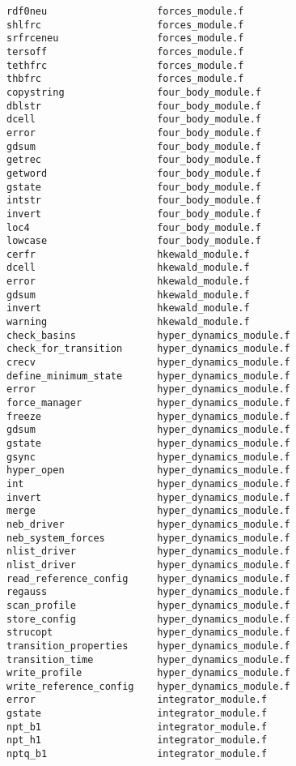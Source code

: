 \begin{verbatim}
rdf0neu                   forces_module.f
shlfrc                    forces_module.f
srfrceneu                 forces_module.f
tersoff                   forces_module.f
tethfrc                   forces_module.f
thbfrc                    forces_module.f
copystring                four_body_module.f
dblstr                    four_body_module.f
dcell                     four_body_module.f
error                     four_body_module.f
gdsum                     four_body_module.f
getrec                    four_body_module.f
getword                   four_body_module.f
gstate                    four_body_module.f
intstr                    four_body_module.f
invert                    four_body_module.f
loc4                      four_body_module.f
lowcase                   four_body_module.f
cerfr                     hkewald_module.f
dcell                     hkewald_module.f
error                     hkewald_module.f
gdsum                     hkewald_module.f
invert                    hkewald_module.f
warning                   hkewald_module.f
check_basins              hyper_dynamics_module.f
check_for_transition      hyper_dynamics_module.f
crecv                     hyper_dynamics_module.f
define_minimum_state      hyper_dynamics_module.f
error                     hyper_dynamics_module.f
force_manager             hyper_dynamics_module.f
freeze                    hyper_dynamics_module.f
gdsum                     hyper_dynamics_module.f
gstate                    hyper_dynamics_module.f
gsync                     hyper_dynamics_module.f
hyper_open                hyper_dynamics_module.f
int                       hyper_dynamics_module.f
invert                    hyper_dynamics_module.f
merge                     hyper_dynamics_module.f
neb_driver                hyper_dynamics_module.f
neb_system_forces         hyper_dynamics_module.f
nlist_driver              hyper_dynamics_module.f
nlist_driver              hyper_dynamics_module.f
read_reference_config     hyper_dynamics_module.f
regauss                   hyper_dynamics_module.f
scan_profile              hyper_dynamics_module.f
store_config              hyper_dynamics_module.f
strucopt                  hyper_dynamics_module.f
transition_properties     hyper_dynamics_module.f
transition_time           hyper_dynamics_module.f
write_profile             hyper_dynamics_module.f
write_reference_config    hyper_dynamics_module.f
error                     integrator_module.f
gstate                    integrator_module.f
npt_b1                    integrator_module.f
npt_h1                    integrator_module.f
nptq_b1                   integrator_module.f

\end{verbatim}
